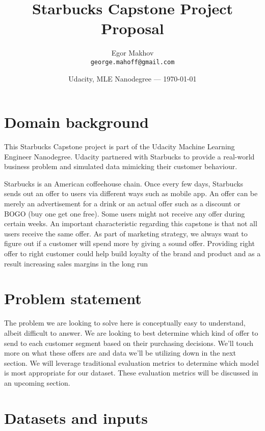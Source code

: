 \documentclass{article}
\title{Starbucks Capstone Project Proposal} %
\author{Egor Makhov\\ \texttt{george.mahoff@gmail.com}} %
\date{Udacity, MLE Nanodegree --- \today} %
\begin{document}
\maketitle %


\section*{Domain background}
This Starbucks Capstone project is part of the Udacity Machine Learning Engineer Nanodegree. Udacity partnered with Starbucks to provide a real-world business problem and simulated data mimicking their customer behaviour.

Starbucks is an American coffeehouse chain. Once every few days, Starbucks sends out an offer to users via different ways such as mobile app. An offer can be merely an advertisement for a drink or an actual offer such as a discount or BOGO (buy one get one free). Some users might not receive any offer during certain weeks. An important characteristic regarding this capstone is that not all users receive the same offer. As part of marketing strategy, we always want to figure out if a customer will spend more by giving a sound offer. Providing right offer to right customer could help build loyalty of the brand and product and as a result increasing sales margins in the long run

\section*{Problem statement}

The problem we are looking to solve here is conceptually easy to understand, albeit difficult to answer. We are looking to best determine which kind of offer to send to each customer segment based on their purchasing decisions. We’ll touch more on what these offers are and data we’ll be utilizing down in the next section. We will leverage traditional evaluation metrics to determine which model is most appropriate for our dataset. These evaluation metrics will be discussed in an upcoming section.

\section*{Datasets and inputs}
\end{document}
